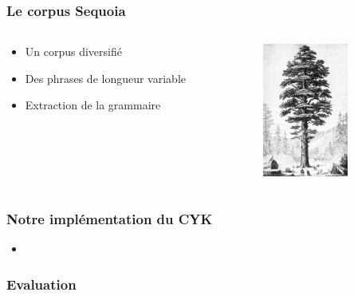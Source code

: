 \documentclass{beamer}
\begin{document}

\begin{frame}
  \frametitle{Le corpus Sequoia}
  \begin{columns}
  \begin{column}{0.5\textwidth}
    \begin{itemize}
     \item{ Un corpus diversifié}
     \item{ Des phrases de longueur variable}
     \item{ Extraction de la grammaire}
     
     
    \end{itemize}
   
  \end{column}
  
  \begin{column}{0.5\textwidth}
  \includegraphics[width=80pt,]{PSM_V03_D341_Sequoia_gigantea_of_california.jpg}  
  \end{column}

  \end{columns}

\end{frame}

\begin{frame}
\frametitle{Notre implémentation du CYK}

\begin{itemize}
 \item{}
\end{itemize}


 
\end{frame}

\begin{frame}
\frametitle{Evaluation}

\end{frame}
\end{document}
